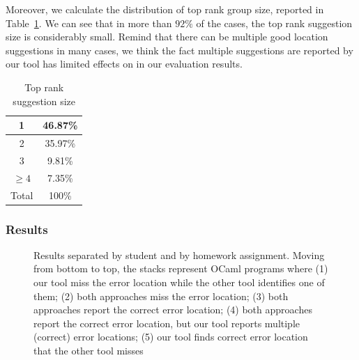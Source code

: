 Moreover, we calculate the distribution of top rank group size,
reported in Table~\ref{table:groupsize}. We can see that in more than
$92\%$ of the cases, the top rank suggestion size is considerably
small. Remind that there can be multiple good location suggestions in
many cases, we think the fact multiple suggestions are reported by our
tool has limited effects on in our evaluation results.

\begin{table}
\centering
\begin{tabular}{|c | c|}
\hline
1 & 46.87\% \\
\hline
2 & 35.97\% \\
\hline
3 & 9.81\% \\
\hline
$\geq 4$ & 7.35\% \\
\hline
Total & 100\% \\
\hline
\end{tabular}
\caption{Top rank suggestion size}
\label{table:groupsize}
\end{table}

\subsubsection{Results}

\begin{figure}
\begin{center}
%
\end{center}
\caption{Results separated by student and by homework assignment.
Moving from bottom to top, the stacks represent OCaml programs where
%
(1) our tool miss the error location while the other tool identifies
one of them; 
%
(2) both approaches miss the error location; 
%
(3) both approaches report the correct error location; 
%
(4) both approaches report the correct error location, but our tool
reports multiple (correct) error locations; 
%
(5) our tool finds correct error location that the other tool misses} 
\label{fig:ocamlresult}
\end{figure}

